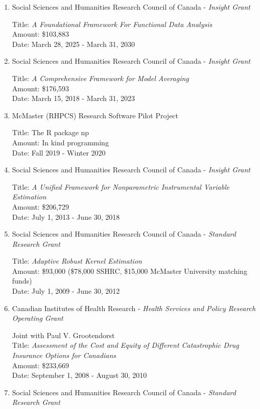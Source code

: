 \documentclass[
]{article}
\begin{document}
\begin{enumerate}
\def\labelenumi{\arabic{enumi}.}
\item
  Social Sciences and Humanities Research Council of Canada -
  \emph{Insight Grant}

  Title: \emph{A Foundational Framework For Functional Data Analysis}\\
  Amount: \$103,883\\
  Date: March 28, 2025 - March 31, 2030
\item
  Social Sciences and Humanities Research Council of Canada -
  \emph{Insight Grant}

  Title: \emph{A Comprehensive Framework for Model Averaging}\\
  Amount: \$176,593\\
  Date: March 15, 2018 - March 31, 2023
\item
  McMaster (RHPCS) Research Software Pilot Project

  Title: The R package np\\
  Amount: In kind programming\\
  Date: Fall 2019 - Winter 2020
\item
  Social Sciences and Humanities Research Council of Canada -
  \emph{Insight Grant}

  Title: \emph{A Unified Framework for Nonparametric Instrumental
  Variable Estimation}\\
  Amount: \$206,729\\
  Date: July 1, 2013 - June 30, 2018
\item
  Social Sciences and Humanities Research Council of Canada -
  \emph{Standard Research Grant}

  Title: \emph{Adaptive Robust Kernel Estimation}\\
  Amount: \$93,000 (\$78,000 SSHRC, \$15,000 McMaster University
  matching funds)\\
  Date: July 1, 2009 - June 30, 2012
\item
  Canadian Institutes of Health Research - \emph{Health Services and
  Policy Research Operating Grant}

  Joint with Paul V. Grootendorst\\
  Title: \emph{Assessment of the Cost and Equity of Different
  Catastrophic Drug Insurance Options for Canadians}\\
  Amount: \$233,669\\
  Date: September 1, 2008 - August 30, 2010
\item
  Social Sciences and Humanities Research Council of Canada -
  \emph{Standard Research Grant}


\end{enumerate}
\end{document}
